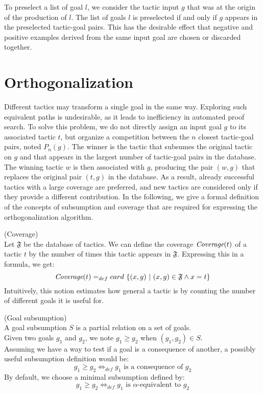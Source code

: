 \documentclass[runningheads,a4paper,draft]{svjour3}
\begin{document}
To preselect a list of goal $l$, we consider the tactic input $g$ that was
at the origin of the production of $l$. The list of goals $l$ is preselected if
and only if $g$ appears in the preselected tactic-goal pairs. This has the
desirable effect that negative and positive examples derived from the same
input goal are chosen or discarded together.

\section{Orthogonalization}\label{sec:ortho}
Different tactics may transform a single goal in the same way. Exploring such
equivalent paths
is undesirable, as it leads to inefficiency in automated proof search.
To solve this problem, we do not directly assign an input goal $g$ to its
associated tactic $t$, but organize a competition between the $n$ closest
tactic-goal pairs, noted $P_n(g)$.
The winner is the tactic that subsumes the original tactic on $g$ and that
appears in the largest number of tactic-goal pairs in the database.
The winning tactic $w$ is then associated with $g$, producing the pair $(w,g)$
that replaces the original pair $(t,g)$ in the database. As a
result, already successful tactics with a large coverage are preferred, and new
tactics are
considered only if they provide a different contribution. In the following, we
give a formal definition of the concepts of subsumption and coverage that are
required for expressing the orthogonalization algorithm.

\begin{definition} (Coverage)\\
Let $\mathfrak{F}$ be the database of tactics. We can define the
coverage $\textit{\mbox{Coverage}}(t)$ of a tactic $t$ by the number of times
this tactic
appears in
$\mathfrak{F}$. Expressing this in a formula, we get:
  \[\textit{\mbox{Coverage}}(t) =_{def} card\ \lbrace (x,g)\ |\ (x,g) \in
  \mathfrak{F}
  \wedge x
  = t
  \rbrace  \]
Intuitively, this notion estimates how general a tactic is by counting the
number of different goals it is useful for.
\end{definition}


\begin{definition} (Goal subsumption)\\
A goal subsumption $S$ is a partial relation on a set of goals.\\
Given two goals $g_1$ and $g_2$, we note $g_1 \ge g_2$ when  $(g_1,g_2) \in
S$.\\
Assuming we have a way to test if a goal is a consequence of another, a
possibly useful subsumption definition would be:
\[g_1 \ge g_2  \Leftrightarrow_{def} g_1 \mbox{ is a consequence of } g_2\]
By default, we choose a minimal subsumption defined by:
\[g_1 \ge g_2  \Leftrightarrow_{def} g_1 \mbox{ is }\alpha\mbox{-equivalent
to } g_2\]
\end{definition}
\end{document}
